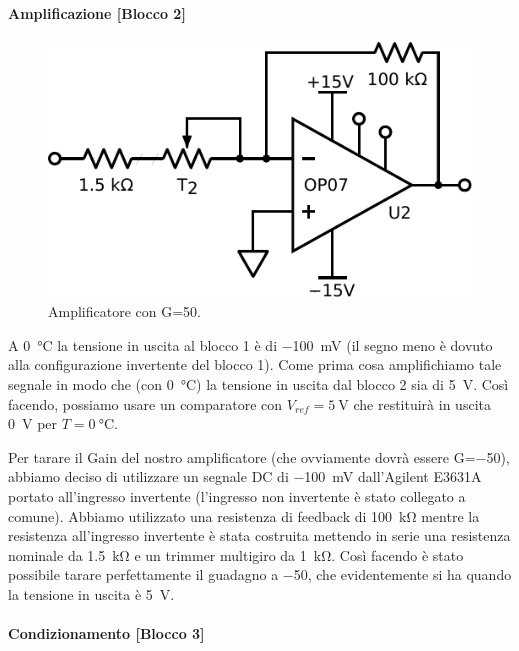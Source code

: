\paragraph{Amplificazione [Blocco 2]\newline}

\begin{figure}
\centering
\includegraphics[width=.3\textwidth]{../E06/latex/P2.pdf}
\caption{Amplificatore con G=50.}
\label{cir6:blocco2}
\end{figure}

A \SI{0}{\celsius} la tensione in uscita al blocco 1 è di \SI{-100}{\mV} (il segno meno è dovuto alla configurazione invertente del blocco 1).
Come prima cosa amplifichiamo tale segnale in modo che (con \SI{0}{\celsius}) la tensione in uscita dal blocco 2 sia di \SI{5}{\volt}.
Così facendo, possiamo usare un comparatore con $V_{ref}=\SI{5}{\volt}$ che restituirà in uscita \SI{0}{\volt} per $T=\SI{0}{\celsius}$.

Per tarare il Gain del nostro amplificatore (che ovviamente dovrà essere G=\num{-50}), abbiamo deciso di utilizzare un segnale DC di \SI{-100}{\mV} dall'Agilent E3631A portato all'ingresso invertente (l'ingresso non invertente è stato collegato a comune).
Abbiamo utilizzato una resistenza di feedback di \SI{100}{\kilo\ohm} mentre la resistenza all'ingresso invertente è stata costruita mettendo in serie una resistenza nominale da \SI{1.5}{\kilo\ohm} e un trimmer multigiro da \SI{1}{\kilo\ohm}.
Così facendo è stato possibile tarare perfettamente il guadagno a \num{-50}, che evidentemente si ha quando la tensione in uscita è \SI{5}{\volt}. 

\paragraph{Condizionamento [Blocco 3]\newline}

